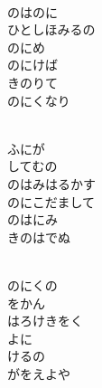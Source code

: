 \documentclass[10pt,b5j]{tarticle} %
\begin{document}
\begin{enumerate}
\begin{minipage}[c]{\blocksize}
    \end{minipage}
    \begin{minipage}[c]{\blocksize}
        
        \vspace{\linespace}
        \item~\\
        のはのに\\
        ひとしほみるの\\
        のにめ\\
        のにけば\\
        きのりて\\
        のにくなり
        
    \end{minipage}
    \begin{minipage}[c]{\blocksize}
        
        \vspace{\linespace}
        \item~\\
        ふにが\\
        してむの\\
        のはみはるかす\\
        のにこだまして\\
        のはにみ\\
        きのはでぬ
        
    \end{minipage}
    \begin{minipage}[c]{\blocksize}
        
        \vspace{\linespace}
        \item~\\
        のにくの\\
        をかん\\
        はろけきをく\\
        よに\\
        けるの\\
        がをえよや
    
    \end{minipage}
\end{enumerate} %
\end{document}
